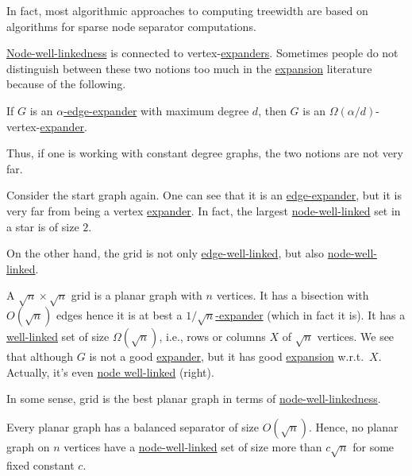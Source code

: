 \begin{remark}
	In fact, most algorithmic approaches to computing treewidth are based on algorithms for sparse node separator computations.
\end{remark}

\hyperref[def:node-well-linked]{Node-well-linkedness} is connected to vertex-\hyperref[def:expander]{expanders}. Sometimes people do not distinguish between these two notions too much in the \hyperref[def:expansion]{expansion} literature because of the following.

\begin{claim}
	If \(G\) is an \hyperref[def:expander]{\(\alpha \)-edge-expander} with maximum degree \(d\), then \(G\) is an \(\Omega (\alpha / d)\)-vertex-\hyperref[def:expander]{expander}.
\end{claim}

Thus, if one is working with constant degree graphs, the two notions are not very far.

\begin{eg}[Star]
	Consider the start graph again. One can see that it is an \hyperref[def:expander]{edge-expander}, but it is very far from being a vertex \hyperref[def:expander]{expander}. In fact, the largest \hyperref[def:node-well-linked]{node-well-linked} set in a star is of size \(2\).
\end{eg}

On the other hand, the grid is not only  \hyperref[def:well-linked]{edge-well-linked}, but also \hyperref[def:node-well-linked]{node-well-linked}.

\begin{eg}[Grid]
	A \(\sqrt{n} \times \sqrt{n} \) grid is a planar graph with \(n\) vertices. It has a bisection with \(O(\sqrt{n} )\) edges hence it is at best a \hyperref[def:expander]{\(1 / \sqrt{n} \)-expander} (which in fact it is). It has a \hyperref[def:fractional-well-linked]{well-linked} set of size \(\Omega (\sqrt{n} )\), i.e., rows or columns \(X\) of \(\sqrt{n} \) vertices. We see that although \(G\) is not a good \hyperref[def:expander]{expander}, but it has good \hyperref[def:expansion]{expansion} w.r.t.\ \(X\). Actually, it's even \hyperref[def:node-linkage]{node well-linked} (right).
	\begin{center}
	\end{center}
\end{eg}

In some sense, grid is the best planar graph in terms of \hyperref[def:node-well-linked]{node-well-linkedness}.

\begin{theorem}
	Every planar graph has a balanced separator of size \(O(\sqrt{n} )\). Hence, no planar graph on \(n\) vertices have a \hyperref[def:node-well-linked]{node-well-linked} set of size more than \(c \sqrt{n} \) for some fixed constant \(c\).
\end{theorem}